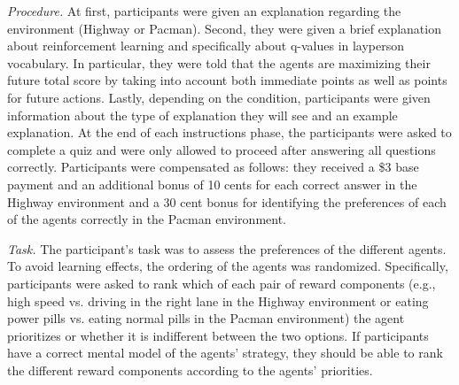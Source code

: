\documentclass[runningheads]{llncs}
\begin{document}
\emph{Procedure.} At first, participants were given an explanation regarding the environment (Highway or Pacman). 
Second, they were given a brief explanation about reinforcement learning and specifically about q-values in layperson vocabulary.
In particular, they were told that the agents are maximizing their future total score by taking into account both immediate points as well as points for future actions. 
Lastly, depending on the condition, participants were given information about the type of explanation they will see and an example explanation.
At the end of each instructions phase, the participants were asked to complete a quiz and were only allowed to proceed after answering all questions correctly.
Participants were compensated as follows: they received a \$3 base payment and an additional bonus of 10 cents for each correct answer in the Highway environment and a 30 cent bonus for identifying the preferences of each of the agents correctly in the Pacman environment.

\emph{Task.} 
The participant's task was to assess the preferences of the different agents.
To avoid learning effects, the ordering of the agents was randomized. 
Specifically, participants were asked to rank which of each pair of reward components (e.g., high speed vs. driving in the right lane in the Highway environment or  eating power pills vs. eating normal pills in the Pacman environment) the agent prioritizes or whether it is indifferent between the two options.
If participants have a correct mental model of the agents' strategy, they should be able to rank the different reward components according to the agents' priorities.
\end{document}
